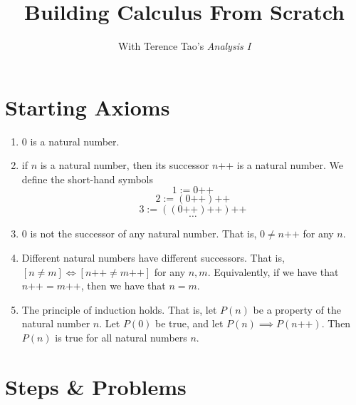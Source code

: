 \documentclass[12pt]{article}
\title{\vspace{-1cm}\textbf{Building Calculus From Scratch }}
\author{With Terence Tao's \textit{Analysis I}}
\begin{document}
\maketitle
\vspace{-1em}

\newenvironment{justifiedproof}{%
  \begin{tabular}{@{}p{0.6\linewidth}@{\quad}p{0.12\linewidth}@{}}%
}{\end{tabular}}

\section{Starting Axioms}
\begin{enumerate}
	\item $0$ is a natural number.
	\item if $n$ is a natural number, then its successor $n$++ is a natural number. We define the short-hand symbols
	$$1 := 0\text{++}$$
	$$2 := (0\text{++})\text{++}$$
	$$3 := ((0\text{++})\text{++})\text{++}$$
	$$\hdots$$
	\item $0$ is not the successor of any natural number. That is, $0 \neq n\text{++}$ for any $n$.
	\item Different natural numbers have different successors. That is, $[n \neq m] \iff [n\text{++} \neq m\text{++}]$ for any $n,m$. Equivalently, if we have that $n\text{++} = m\text{++}$, then we have that $n=m$.
	\item The principle of induction holds. That is, let $P(n)$ be a property of the natural number $n$. Let $P(0)$ be true, and let $P(n) \implies P(n\text{++})$. Then $P(n)$ is true for all natural numbers $n$.
 \end{enumerate}


\section{Steps \& Problems}
\end{document}
